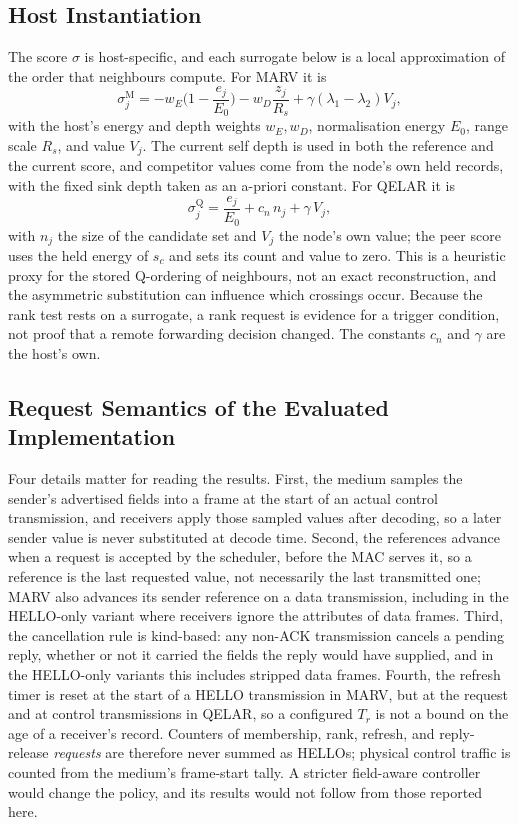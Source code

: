 \subsection{Host Instantiation}
\label{sec:hosts}
The score $\sigma$ is host-specific, and each surrogate below is a local approximation of the order that neighbours compute. For MARV it is
\begin{equation}
\sigma^{\mathrm{M}}_j=-w_E\Big(1-\frac{e_j}{E_0}\Big)-w_D\frac{z_j}{R_s}+\gamma(\lambda_1-\lambda_2)V_j,
\label{eq:marv_score}
\end{equation}
with the host's energy and depth weights $w_E,w_D$, normalisation energy $E_0$, range scale $R_s$, and value $V_j$. The current self depth is used in both the reference and the current score, and competitor values come from the node's own held records, with the fixed sink depth taken as an a-priori constant. For QELAR it is
\begin{equation}
\sigma^{\mathrm{Q}}_j=\frac{e_j}{E_0}+c_n\,n_j+\gamma\,V_j,
\label{eq:qelar_score}
\end{equation}
with $n_j$ the size of the candidate set and $V_j$ the node's own value; the peer score uses the held energy of $s_c$ and sets its count and value to zero. This is a heuristic proxy for the stored Q-ordering of neighbours, not an exact reconstruction, and the asymmetric substitution can influence which crossings occur. Because the rank test rests on a surrogate, a rank request is evidence for a trigger condition, not proof that a remote forwarding decision changed. The constants $c_n$ and $\gamma$ are the host's own.

\subsection{Request Semantics of the Evaluated Implementation}
\label{sec:semantics}
Four details matter for reading the results. First, the medium samples the sender's advertised fields into a frame at the start of an actual control transmission, and receivers apply those sampled values after decoding, so a later sender value is never substituted at decode time. Second, the references advance when a request is accepted by the scheduler, before the MAC serves it, so a reference is the last requested value, not necessarily the last transmitted one; MARV also advances its sender reference on a data transmission, including in the HELLO-only variant where receivers ignore the attributes of data frames. Third, the cancellation rule is kind-based: any non-ACK transmission cancels a pending reply, whether or not it carried the fields the reply would have supplied, and in the HELLO-only variants this includes stripped data frames. Fourth, the refresh timer is reset at the start of a HELLO transmission in MARV, but at the request and at control transmissions in QELAR, so a configured $T_r$ is not a bound on the age of a receiver's record. Counters of membership, rank, refresh, and reply-release \emph{requests} are therefore never summed as HELLOs; physical control traffic is counted from the medium's frame-start tally. A stricter field-aware controller would change the policy, and its results would not follow from those reported here.

